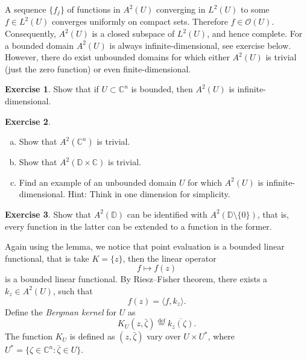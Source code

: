 \documentclass[12pt,openany]{book}
\newcommand{\linnprod}[2]{\langle #1 , #2 \rangle}
\newcommand{\C}{{\mathbb{C}}}
\newcommand{\D}{{\mathbb{D}}}
\newcommand{\sO}{{\mathscr{O}}}
\newcommand{\myindex}[1]{#1\index{#1}}
\theoremstyle{plain}
\theoremstyle{remark}
\theoremstyle{definition}
\newenvironment{exbox}{%
    \def\FrameCommand{\vrule width 1pt \relax\hspace {10pt}}%
    \MakeFramed {\advance \hsize -\width \FrameRestore }%
}{%
    \endMakeFramed
}
\newenvironment{exparts}{%
    \leavevmode\begin{enumerate}[a),noitemsep,topsep=0pt,parsep=0pt,partopsep=0pt]
}{%
    \end{enumerate}
}
\theoremstyle{exercise}
\newtheorem{exercise}{Exercise}[section]
\theoremstyle{example}
\begin{document}
A sequence $\{ f_j \}$ of functions in $A^2(U)$
converging in $L^2(U)$ to some $f \in
L^2(U)$ converges uniformly on compact sets.  Therefore $f \in \sO(U)$.
Consequently, $A^2(U)$ is a closed subspace of $L^2(U)$, and hence complete.
For a bounded domain $A^2(U)$ is always infinite-dimensional, see exercise
below.  However, there do exist unbounded domains for which either 
$A^2(U)$ is trivial (just the zero function) or even finite-dimensional.

\begin{exbox}
\begin{exercise}
Show that if $U \subset \C^n$ is bounded, then $A^2(U)$ is
infinite-dimensional.
\end{exercise}

\begin{exercise}
\begin{exparts}
\item
Show that $A^2(\C^n)$ is trivial.
\item
Show that $A^2(\D \times \C)$ is trivial.
\item
Find an example of an unbounded domain $U$ for which $A^2(U)$ is
infinite-dimensional.
Hint: Think in one dimension for simplicity.
\end{exparts}
\end{exercise}

\begin{exercise}
Show that $A^2(\D)$ can be identified with $A^2(\D \setminus \{ 0 \})$,
that is, every function in the latter can be extended to a function in the
former.
\end{exercise}
\end{exbox}

Again using the lemma, we notice that point evaluation is a bounded linear
functional, that is take $K= \{ z \}$, then the linear operator
\begin{equation*}
f \mapsto f(z)
\end{equation*}
is a bounded linear functional.  By Riesz--Fisher theorem, there exists
a $k_z \in A^2(U)$, such that
\begin{equation*}
f(z) = \linnprod{f}{k_z} .
\end{equation*}
Define the \emph{\myindex{Bergman kernel}} for $U$ as
%
\begin{equation*}
K_U(z,\bar{\zeta}) \overset{\text{def}}{=} \overline{k_z(\zeta)} .
\end{equation*}
The function $K_U$ is defined as $(z,\bar{\zeta})$ vary over
$U \times U^*$, where $U^* = \{ \zeta \in \C^n : \bar{\zeta} \in U \}$.
\end{document}
